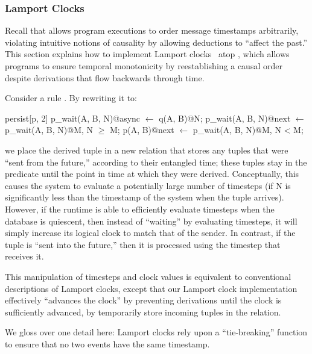 \subsubsection{Lamport Clocks}
\label{sec:lamport}

Recall that \lang allows program executions to order message timestamps arbitrarily, violating intuitive notions of causality by allowing deductions to ``affect the past.''
This section explains how to implement Lamport
clocks~\cite{timeclocks} atop \lang, which allows programs to ensure
temporal monotonicity by reestablishing a causal order
despite derivations that flow backwards through time.

Consider a rule .  By
rewriting it to:

\begin{Dedalus}
persist[p, 2]
p\_wait(A, B, N)@async \(\leftarrow\) q(A, B)@N;
p\_wait(A, B, N)@next \(\leftarrow\) p\_wait(A, B, N)@M, N \(\ge\) M;
p(A, B)@next \(\leftarrow\) p\_wait(A, B, N)@M, N < M;
\end{Dedalus}
\noindent
we place the derived tuple in a new relation  that
stores any tuples that were ``sent from the future,'' according to their entangled time; these tuples stay in the  predicate until the point in
time at which they were derived.  Conceptually, this causes the system
to evaluate a potentially large number of timesteps (if N is
significantly less than the timestamp of the system when the tuple
arrives).  However, if the runtime is able to efficiently evaluate
timesteps when the database is quiescent, then
instead of ``waiting'' by evaluating timesteps, it will simply
increase its logical clock to match that of the sender.   In contrast,
if the tuple is ``sent into the future,'' then it is processed using
the timestep that receives it.

This manipulation of timesteps and clock values is equivalent to
conventional descriptions of Lamport clocks, except that our Lamport
clock implementation effectively ``advances the clock'' by preventing derivations until the clock is sufficiently advanced, by temporarily store incoming tuples
in the  relation.

We gloss over one detail here: Lamport clocks rely
upon a ``tie-breaking'' function to ensure that no two events have the
same timestamp.  
